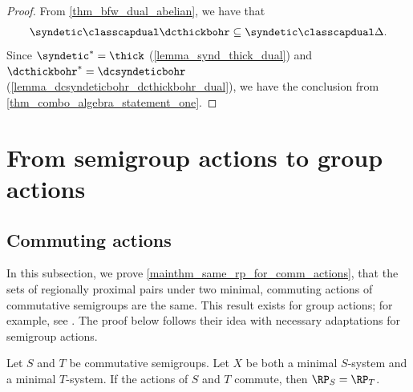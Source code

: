 \begin{proof}
\leanok{}
    From \cref{thm_bfw_dual_abelian}, we have that
    \[\syndetic \classcapdual \dcthickbohr \subseteq \syndetic \classcapdual \Delta.\]
    Since $\syndetic^* = \thick$ (\cref{lemma_synd_thick_dual}) and $\dcthickbohr^* = \dcsyndeticbohr$ (\cref{lemma_dcsyndeticbohr_dcthickbohr_dual}), we have the conclusion from \cref{thm_combo_algebra_statement_one}.
\end{proof}

\section{From semigroup actions to group actions}
\label{sec_nat_extension}


\subsection{Commuting actions}
\label{sec_proof_of_comm_actions_thm}

In this subsection, we prove \cref{mainthm_same_rp_for_comm_actions}, that the sets of regionally proximal pairs under two minimal, commuting actions of commutative semigroups are the same. This result exists for group actions; for example, see \cite[Thm. 1.1]{shao_xu_2026}.  The proof below follows their idea with necessary adaptations for semigroup actions.


\begin{theorem}
    \label{mainthm_same_rp_for_comm_actions}
    Let $S$ and $T$ be commutative semigroups.  Let $X$ be both a minimal $S$-system and a minimal $T$-system.  If the actions of $S$ and $T$ commute, then $\RP_S = \RP_T$.
\end{theorem}

